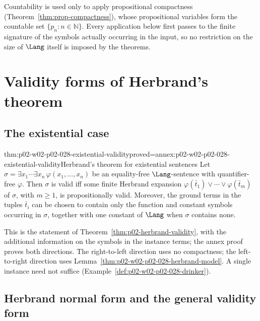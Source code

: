 Countability is used only to apply propositional compactness
(Theorem~\ref{thm:prop-compactness}), whose propositional variables form the
countable set \(\{p_n:n\in\mathbb N\}\).  Every application below first passes
to the finite signature of the symbols actually occurring in the input, so
no restriction on the size of \(\Lang\) itself is imposed by the theorems.

\section{Validity forms of Herbrand's theorem}
\label{sec:p02-w02-p02-028-validity-forms}

\subsection{The existential case}
\label{sec:p02-w02-p02-028-existential}

\begin{hbtheorem}{thm:p02-w02-p02-028-existential-validity}{proved=annex:p02-w02-p02-028-existential-validity}{Herbrand's theorem for existential sentences}
Let \(\sigma=\exists x_1\cdots\exists x_n\,\varphi(x_1,\ldots,x_n)\) be an
equality-free \(\Lang\)-sentence with quantifier-free \(\varphi\).  Then
\(\sigma\) is valid iff some finite Herbrand expansion
\(\varphi(\bar t_1)\lor\cdots\lor\varphi(\bar t_m)\) of \(\sigma\), with
\(m\geq1\), is propositionally valid.  Moreover, the ground terms in the
tuples \(\bar t_i\) can be chosen to contain only the function and constant
symbols occurring in \(\sigma\), together with one constant of \(\Lang\) when
\(\sigma\) contains none.
\end{hbtheorem}

This is the statement of Theorem~\ref{thm:p02-herbrand-validity}, with the
additional information on the symbols in the instance terms; the annex proof
proves both directions.  The right-to-left direction uses no compactness; the
left-to-right direction uses Lemma~\ref{thm:p02-w02-p02-028-herbrand-model}.
A single instance need not suffice (Example~\ref{def:p02-w02-p02-028-drinker}).

\subsection{Herbrand normal form and the general validity form}
\label{sec:p02-w02-p02-028-herbrand-normal-form}


